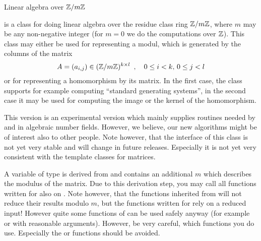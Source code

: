 

\NAME

 \dotfill Linear algebra over $\mathbb{Z}/m\mathbb{Z}$



\ABSTRACT

 is a class for doing linear algebra over the residue class ring $\mathbb{Z}/m\mathbb{Z}$,
where $m$ may be any non-negative integer (for $m = 0$ we do the computations over $\mathbb{Z}$).
This class may either be used for representing a modul, which is generated by the columns of the
matrix
\begin{displaymath}
  A = (a_{i,j}) \in (\mathbb{Z}/m\mathbb{Z})^{k \times l} \enspace,\quad 0\leq i < k,\, 0 \leq j < l
\end{displaymath}
or for representing a homomorphism by its matrix.  In the first case, the class supports for
example computing ``standard generating systems'', in the second case it may be used for
computing the image or the kernel of the homomorphism.

This version is an experimental version which mainly supplies routines needed by 
and  in algebraic number fields.  However, we believe, our new algorithms might be
of interest also to other people.  Note however, that the interface of this class is not yet
very stable and will change in future releases.  Especially it is not yet very consistent with
the template classes for matrices.



\DESCRIPTION

A variable of type  is derived from  and contains an
additional  $m$ which describes the modulus of the matrix.  Due to this derivation
step, you may call all functions written for  also on
.  Note however, that the functions inherited from 
will not reduce their results modulo $m$, but the functions written for 
rely on a reduced input! However quite some functions of  can be used safely
anyway (for example  or  with reasonable arguments).  However, be
very careful, which functions you do use.  Especially the  or
 functions should be avoided.

